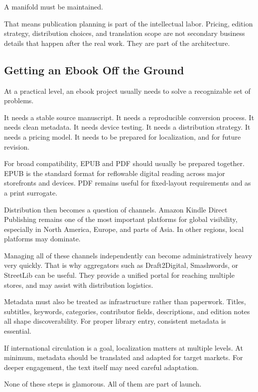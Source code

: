 \documentclass[
]{article}
\begin{document}
A manifold must be maintained.

That means publication planning is part of the intellectual labor.
Pricing, edition strategy, distribution choices, and translation scope
are not secondary business details that happen after the real work. They
are part of the architecture.

\hypertarget{getting-an-ebook-off-the-ground}{%
\subsection{Getting an Ebook Off the
Ground}\label{getting-an-ebook-off-the-ground}}

At a practical level, an ebook project usually needs to solve a
recognizable set of problems.

It needs a stable source manuscript. It needs a reproducible conversion
process. It needs clean metadata. It needs device testing. It needs a
distribution strategy. It needs a pricing model. It needs to be prepared
for localization, and for future revision.

For broad compatibility, EPUB and PDF should usually be prepared
together. EPUB is the standard format for reflowable digital reading
across major storefronts and devices. PDF remains useful for
fixed-layout requirements and as a print surrogate.

Distribution then becomes a question of channels. Amazon Kindle Direct
Publishing remains one of the most important platforms for global
visibility, especially in North America, Europe, and parts of Asia. In
other regions, local platforms may dominate.

Managing all of these channels independently can become administratively
heavy very quickly. That is why aggregators such as Draft2Digital,
Smashwords, or StreetLib can be useful. They provide a unified portal
for reaching multiple stores, and may assist with distribution
logistics.

Metadata must also be treated as infrastructure rather than paperwork.
Titles, subtitles, keywords, categories, contributor fields,
descriptions, and edition notes all shape discoverability. For proper
library entry, consistent metadata is essential.

If international circulation is a goal, localization matters at multiple
levels. At minimum, metadata should be translated and adapted for target
markets. For deeper engagement, the text itself may need careful
adaptation.

None of these steps is glamorous. All of them are part of launch.
\end{document}
